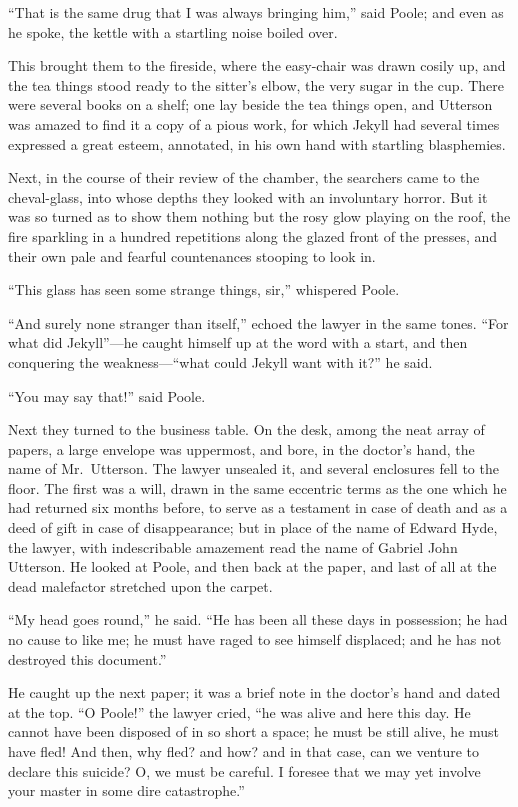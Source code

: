 \documentclass[12pt,openright]{book}
\begin{document}
“That is the same drug that I was always bringing him,” said Poole; and even as he spoke, the kettle with a startling noise boiled over.

This brought them to the fireside, where the easy-chair was drawn cosily up, and the tea things stood ready to the sitter’s elbow, the very sugar in the cup. There were several books on a shelf; one lay beside the tea things open, and Utterson was amazed to find it a copy of a pious work, for which Jekyll had several times expressed a great esteem, annotated, in his own hand with startling blasphemies.

Next, in the course of their review of the chamber, the searchers came to the cheval-glass, into whose depths they looked with an involuntary horror. But it was so turned as to show them nothing but the rosy glow playing on the roof, the fire sparkling in a hundred repetitions along the glazed front of the presses, and their own pale and fearful countenances stooping to look in.

“This glass has seen some strange things, sir,” whispered Poole.

“And surely none stranger than itself,” echoed the lawyer in the same tones. “For what did Jekyll”—he caught himself up at the word with a start, and then conquering the weakness—“what could Jekyll want with it?” he said.

“You may say that!” said Poole.

Next they turned to the business table. On the desk, among the neat array of papers, a large envelope was uppermost, and bore, in the doctor’s hand, the name of Mr. Utterson. The lawyer unsealed it, and several enclosures fell to the floor. The first was a will, drawn in the same eccentric terms as the one which he had returned six months before, to serve as a testament in case of death and as a deed of gift in case of disappearance; but in place of the name of Edward Hyde, the lawyer, with indescribable amazement read the name of Gabriel John Utterson. He looked at Poole, and then back at the paper, and last of all at the dead malefactor stretched upon the carpet.

“My head goes round,” he said. “He has been all these days in possession; he had no cause to like me; he must have raged to see himself displaced; and he has not destroyed this document.”

He caught up the next paper; it was a brief note in the doctor’s hand and dated at the top. “O Poole!” the lawyer cried, “he was alive and here this day. He cannot have been disposed of in so short a space; he must be still alive, he must have fled! And then, why fled? and how? and in that case, can we venture to declare this suicide? O, we must be careful. I foresee that we may yet involve your master in some dire catastrophe.”
\end{document}
